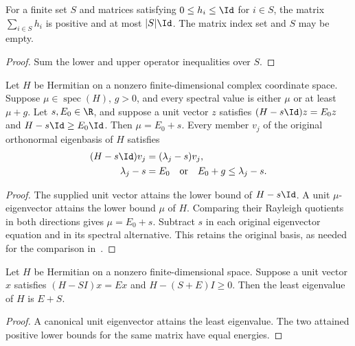 \begin{theorem}
    \label{thm:positive_unit_sum_budget}
    \leanok
    For a finite set $S$ and matrices satisfying $0\le h_i\le\Id$ for
    $i\in S$, the matrix $\sum_{i\in S}h_i$ is positive and at most $|S|\Id$.
    The matrix index set and $S$ may be empty.
\end{theorem}
\begin{proof}
    \leanok
    Sum the lower and upper operator inequalities over $S$.
\end{proof}

\begin{theorem}
    \label{thm:original_basis_centered_gap}
    \leanok
    Let $H$ be Hermitian on a nonzero finite-dimensional complex coordinate
    space. Suppose $\mu\in\operatorname{spec}(H)$, $g>0$, and every spectral
    value is either $\mu$ or at least $\mu+g$. Let $s,E_0\in\R$, and suppose
    a unit vector $z$ satisfies
    $(H-s\Id)z=E_0z$ and $H-s\Id\ge E_0\Id$. Then $\mu=E_0+s$.
    Every member $v_j$ of the original orthonormal eigenbasis of $H$ satisfies
    \begin{align}
        (H-s\Id)v_j & =(\lambda_j-s)v_j,\notag                     \\
        \lambda_j-s & =E_0\quad\text{or}\quad E_0+g\le\lambda_j-s.
    \end{align}
\end{theorem}
\begin{proof}\leanok
    The supplied unit vector attains the lower bound of $H-s\Id$.
    A unit $\mu$-eigenvector attains the lower bound $\mu$ of $H$.
    Comparing their Rayleigh quotients in both directions gives
    $\mu=E_0+s$. Subtract $s$ in each original eigenvector equation and in
    its spectral alternative. This retains the original basis, as needed
    for the comparison in~\cite[lines 909--960]{Arad2016RigorousRG}.
\end{proof}

\begin{lemma}
    \label{lem:attained_canonical_ground_energy}
    \leanok
    Let $H$ be Hermitian on a nonzero finite-dimensional space. Suppose a
    unit vector $x$ satisfies $(H-SI)x=Ex$ and $H-(S+E)I\ge0$.
    Then the least eigenvalue of $H$ is $E+S$.
\end{lemma}
\begin{proof}\leanok
    A canonical unit eigenvector attains the least eigenvalue. The two
    attained positive lower bounds for the same matrix have equal energies.
\end{proof}


